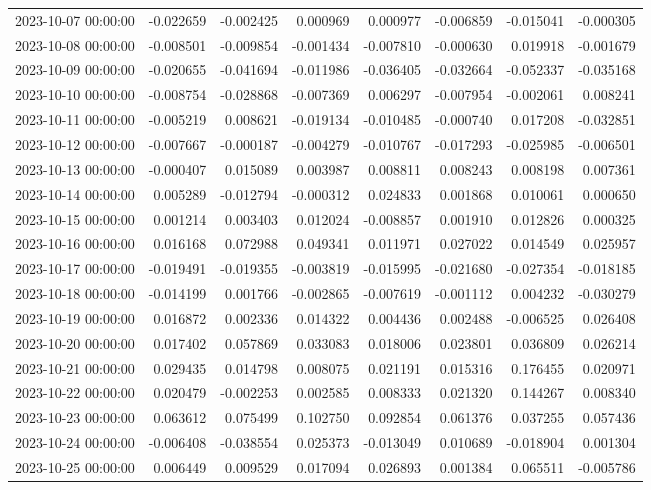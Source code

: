 \begin{tabular}{lrrrrrrr}
2023-10-07 00:00:00 & -0.022659 & -0.002425 & 0.000969 & 0.000977 & -0.006859 & -0.015041 & -0.000305 \\
2023-10-08 00:00:00 & -0.008501 & -0.009854 & -0.001434 & -0.007810 & -0.000630 & 0.019918 & -0.001679 \\
2023-10-09 00:00:00 & -0.020655 & -0.041694 & -0.011986 & -0.036405 & -0.032664 & -0.052337 & -0.035168 \\
2023-10-10 00:00:00 & -0.008754 & -0.028868 & -0.007369 & 0.006297 & -0.007954 & -0.002061 & 0.008241 \\
2023-10-11 00:00:00 & -0.005219 & 0.008621 & -0.019134 & -0.010485 & -0.000740 & 0.017208 & -0.032851 \\
2023-10-12 00:00:00 & -0.007667 & -0.000187 & -0.004279 & -0.010767 & -0.017293 & -0.025985 & -0.006501 \\
2023-10-13 00:00:00 & -0.000407 & 0.015089 & 0.003987 & 0.008811 & 0.008243 & 0.008198 & 0.007361 \\
2023-10-14 00:00:00 & 0.005289 & -0.012794 & -0.000312 & 0.024833 & 0.001868 & 0.010061 & 0.000650 \\
2023-10-15 00:00:00 & 0.001214 & 0.003403 & 0.012024 & -0.008857 & 0.001910 & 0.012826 & 0.000325 \\
2023-10-16 00:00:00 & 0.016168 & 0.072988 & 0.049341 & 0.011971 & 0.027022 & 0.014549 & 0.025957 \\
2023-10-17 00:00:00 & -0.019491 & -0.019355 & -0.003819 & -0.015995 & -0.021680 & -0.027354 & -0.018185 \\
2023-10-18 00:00:00 & -0.014199 & 0.001766 & -0.002865 & -0.007619 & -0.001112 & 0.004232 & -0.030279 \\
2023-10-19 00:00:00 & 0.016872 & 0.002336 & 0.014322 & 0.004436 & 0.002488 & -0.006525 & 0.026408 \\
2023-10-20 00:00:00 & 0.017402 & 0.057869 & 0.033083 & 0.018006 & 0.023801 & 0.036809 & 0.026214 \\
2023-10-21 00:00:00 & 0.029435 & 0.014798 & 0.008075 & 0.021191 & 0.015316 & 0.176455 & 0.020971 \\
2023-10-22 00:00:00 & 0.020479 & -0.002253 & 0.002585 & 0.008333 & 0.021320 & 0.144267 & 0.008340 \\
2023-10-23 00:00:00 & 0.063612 & 0.075499 & 0.102750 & 0.092854 & 0.061376 & 0.037255 & 0.057436 \\
2023-10-24 00:00:00 & -0.006408 & -0.038554 & 0.025373 & -0.013049 & 0.010689 & -0.018904 & 0.001304 \\
2023-10-25 00:00:00 & 0.006449 & 0.009529 & 0.017094 & 0.026893 & 0.001384 & 0.065511 & -0.005786 \\

\end{tabular}

